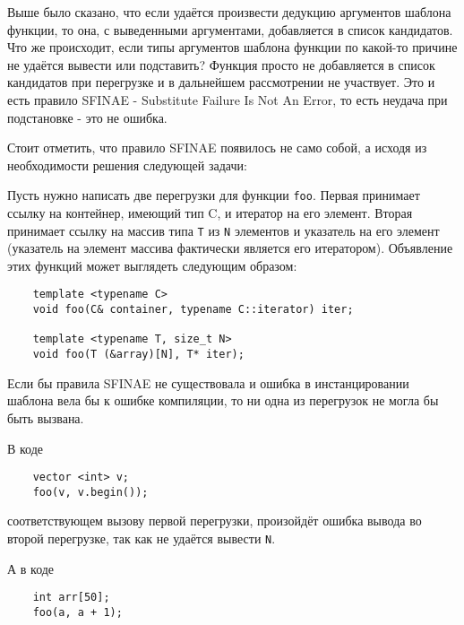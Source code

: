 	Выше было сказано, что если удаётся произвести дедукцию аргументов шаблона функции, то она, с выведенными аргументами, добавляется в список кандидатов. Что же происходит, если типы аргументов шаблона функции по какой-то причине не удаётся вывести или подставить? Функция просто не добавляется в список кандидатов при перегрузке и в дальнейшем рассмотрении не участвует. Это и есть правило SFINAE - Substitute Failure Is Not An Error, то есть неудача при подстановке - это не ошибка.
	
	\vspace{\baselineskip}	
	
	Стоит отметить, что правило SFINAE появилось не само собой, а исходя из необходимости решения следующей задачи:
	
	Пусть нужно написать две перегрузки для функции \texttt{foo}. Первая принимает ссылку на контейнер, имеющий тип C, и итератор на его элемент. Вторая принимает ссылку на массив типа \texttt{T} из \texttt{N} элементов и указатель на его элемент (указатель на элемент массива фактически является его итератором). Объявление этих функций может выглядеть следующим образом:
	
	\begin{verbatim}
	template <typename C>
	void foo(C& container, typename C::iterator) iter;
	
	template <typename T, size_t N>
	void foo(T (&array)[N], T* iter);
	\end{verbatim}
	
	Если бы правила SFINAE не существовала и ошибка в инстанцировании шаблона вела бы к ошибке компиляции, то ни одна из перегрузок не могла бы быть вызвана.
	
	В коде
	
	\begin{verbatim}
	vector <int> v;
	foo(v, v.begin());
	\end{verbatim}
	
	соответствующем вызову первой перегрузки, произойдёт ошибка вывода во второй перегрузке, так как не удаётся вывести \texttt{N}.
	
	А в коде
	
	\begin{verbatim}
	int arr[50];
	foo(a, a + 1);
	\end{verbatim}
	
